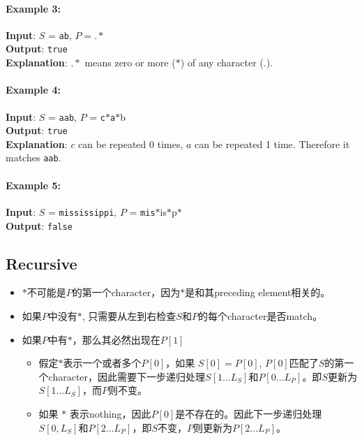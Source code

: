 \paragraph{Example 3:}

\begin{flushleft}
\textbf{Input}: $S$ = \texttt{ab}, $P=.\ast$
\\
\textbf{Output}: \texttt{true}
\\
\textbf{Explanation}: $.\ast$ means zero or more ($\ast$) of any character ($.$).
\end{flushleft}

\paragraph{Example 4:}

\begin{flushleft}
\textbf{Input}: $S$ = \texttt{aab}, $P$ = \texttt{c}$\ast$\texttt{a}$\ast$b
\\
\textbf{Output}: \texttt{true}
\\
\textbf{Explanation}: $c$ can be repeated 0 times, $a$ can be repeated 1 time. Therefore it matches \texttt{aab}.
\end{flushleft}

\paragraph{Example 5:}

\begin{flushleft}
\textbf{Input}: $S$ = \texttt{mississippi}, $P$ = \texttt{mis}$\ast$is$\ast$p$\ast$
\\
\textbf{Output}: \texttt{false}
\end{flushleft}

\subsection{Recursive}
\begin{itemize}
\item $\ast$不可能是$P$的第一个character，因为$\ast$是和其preceding element相关的。
\item 如果$P$中没有$\ast$, 只需要从左到右检查$S$和$P$的每个character是否match。
\item 如果$P$中有$\ast$，那么其必然出现在$P[1]$
\begin{itemize}
\item 假定$\ast$表示一个或者多个$P[0]$，如果 $S[0]=P[0]$, $P[0]$匹配了$S$的第一个character，因此需要下一步递归处理$S[1\ldots L_S]$和$P[0\ldots L_P]$。即$S$更新为$S[1\ldots L_S]$，而$P$则不变。
\item 如果 $\ast$ 表示nothing，因此$P[0]$是不存在的。因此下一步递归处理$S[0,L_S]$和$P[2\ldots L_P]$，即$S$不变，$P$则更新为$P[2\ldots L_P]$。
\end{itemize}
\end{itemize}

